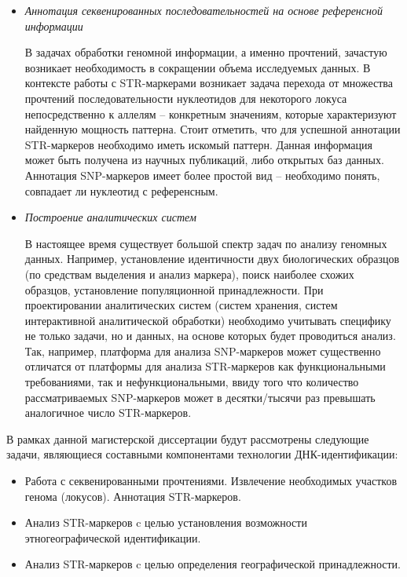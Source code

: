 \begin{itemize}
\item \textit{Аннотация секвенированных последовательностей на основе референсной информации}

В задачах обработки геномной информации, а именно прочтений, зачастую возникает необходимость в
сокращении объема исследуемых данных. В контексте работы с STR-маркерами возникает задача перехода
от множества прочтений последовательности нуклеотидов для некоторого локуса непосредственно к аллелям --
конкретным значениям, которые характеризуют найденную мощность паттерна.
Стоит отметить, что для успешной аннотации STR-маркеров необходимо иметь искомый паттерн. Данная информация
может быть получена из научных публикаций, либо открытых баз данных.
Аннотация SNP-маркеров имеет более простой вид -- необходимо понять, совпадает ли нуклеотид с референсным.

\item \textit{Построение аналитических систем}

В настоящее время существует большой спектр задач по анализу геномных данных.
Например, установление идентичности двух биологических образцов (по средствам выделения и анализ маркера),
поиск наиболее схожих образцов, установление популяционной принадлежности.
При проектировании аналитических систем (систем хранения, систем интерактивной аналитической обработки)
необходимо учитывать специфику не только задачи, но и данных, на основе которых будет проводиться анализ.
Так, например, платформа для анализа SNP-маркеров может существенно отличатся от платформы для анализа STR-маркеров
как функциональными требованиями, так и нефункциональными, ввиду того что количество рассматриваемых SNP-маркеров
может в десятки/тысячи раз превышать аналогичное число STR-маркеров.

\end{itemize}

В рамках данной магистерской диссертации будут рассмотрены следующие задачи,
являющиеся составными компонентами технологии ДНК-идентификации:

\begin{itemize}

\item Работа с секвенированными прочтениями.
Извлечение необходимых участков генома (локусов). Аннотация STR-маркеров.

\item Анализ STR-маркеров c целью установления возможности этногеографической идентификации.

\item Анализ STR-маркеров c целью определения географической принадлежности.

\end{itemize}

